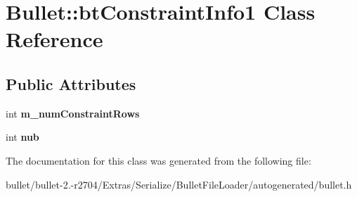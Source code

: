 \hypertarget{class_bullet_1_1bt_constraint_info1}{\section{Bullet\+:\+:bt\+Constraint\+Info1 Class Reference}
\label{class_bullet_1_1bt_constraint_info1}
}
\subsection*{Public Attributes}
\begin{DoxyCompactItemize}
\item 
\hypertarget{class_bullet_1_1bt_constraint_info1_a095c1f5914d8e2dc668f0c7b57ec9357}{int {\bfseries m\+\_\+num\+Constraint\+Rows}}\label{class_bullet_1_1bt_constraint_info1_a095c1f5914d8e2dc668f0c7b57ec9357}

\item 
\hypertarget{class_bullet_1_1bt_constraint_info1_ab4d1d984b3a9a7fd8ab042796fca888f}{int {\bfseries nub}}\label{class_bullet_1_1bt_constraint_info1_ab4d1d984b3a9a7fd8ab042796fca888f}

\end{DoxyCompactItemize}


The documentation for this class was generated from the following file\+:\begin{DoxyCompactItemize}
\item 
bullet/bullet-\/2.-\/r2704/\+Extras/\+Serialize/\+Bullet\+File\+Loader/autogenerated/bullet.\+h\end{DoxyCompactItemize}

